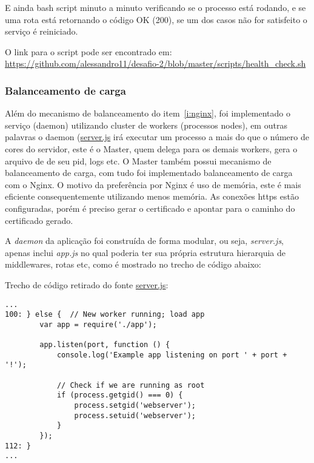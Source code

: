 E ainda bash script minuto a minuto verificando se o processo está rodando, e se
uma rota está retornando o código OK (200), se um dos casos não for
satisfeito o serviço é reiniciado.

O link para o script pode ser encontrado em:\\
\href{https://github.com/alessandro11/desafio-2/blob/master/scripts/health\_check.sh}{https://github.com/alessandro11/desafio-2/blob/master/scripts/health\_check.sh}


\subsubsection{Balanceamento de carga} \label{sec:balanceamento}
Além do mecanismo de balanceamento do item~\ref{i:nginx}, foi
implementado o serviço (daemon) utilizando cluster de workers
(processos nodes), em  outras palavras o daemon
(\href{https://github.com/alessandro11/desafio-2/blob/master/shipitfile.js}{server.js}
irá executar um processo a mais do que o número de cores do servidor,
este é o Master, quem delega para os demais workers, gera o arquivo de
de seu pid, logs etc. O Master também possui mecanismo de
balanceamento de carga, com tudo foi implementado balanceamento de
carga com o Nginx. O motivo da preferência por Nginx é uso de memória,
este é mais eficiente consequentemente utilizando menos memória. As
conexões https estão configuradas, porém é preciso 
gerar o certificado e apontar para o caminho do certificado
gerado.

A \emph{daemon} da aplicação foi construída de forma modular, ou seja,
\emph{server.js}, apenas inclui \emph{app.js} no qual poderia ter sua
própria estrutura hierarquia de middlewares, rotas etc, como é
mostrado no trecho de código abaixo:

Trecho de código retirado do fonte \href{https://github.com/alessandro11/desafio-2/blob/master/server.js}{server.js}:
\begin{verbatim}
...
100: } else {  // New worker running; load app
        var app = require('./app');

        app.listen(port, function () {
            console.log('Example app listening on port ' + port + '!');

            // Check if we are running as root
            if (process.getgid() === 0) {
                process.setgid('webserver');
                process.setuid('webserver');
            }
        });
112: }
...
\end{verbatim}

